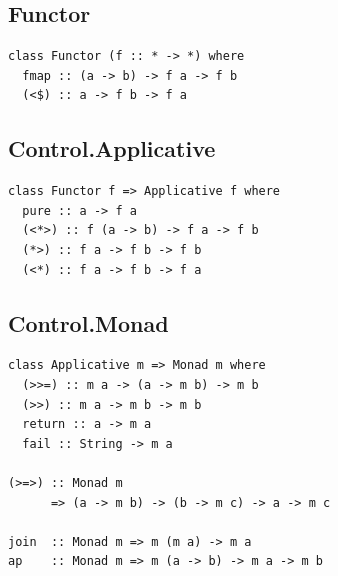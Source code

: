 \begin{multicols}{2}

\begin{box1}
\subsection *{Functor}

\begin{verbatim}
class Functor (f :: * -> *) where
  fmap :: (a -> b) -> f a -> f b
  (<$) :: a -> f b -> f a
\end{verbatim}
\end{box1}

\begin{box2}
\subsection *{Control.Applicative}
\begin{verbatim}
class Functor f => Applicative f where
  pure :: a -> f a
  (<*>) :: f (a -> b) -> f a -> f b
  (*>) :: f a -> f b -> f b
  (<*) :: f a -> f b -> f a
\end{verbatim}
\end{box2}

\begin{box1}
\subsection *{Control.Monad}
\begin{verbatim}
class Applicative m => Monad m where
  (>>=) :: m a -> (a -> m b) -> m b
  (>>) :: m a -> m b -> m b
  return :: a -> m a
  fail :: String -> m a

(>=>) :: Monad m
      => (a -> m b) -> (b -> m c) -> a -> m c

join  :: Monad m => m (m a) -> m a
ap    :: Monad m => m (a -> b) -> m a -> m b

\end{verbatim}
\end{box1}

\end{multicols}

